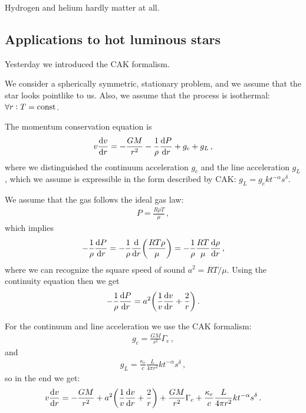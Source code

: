 \documentclass[main.tex]{subfiles}
\begin{document}
Hydrogen and helium hardly matter at all.
 
\subsection{Applications to hot luminous stars}

Yesterday we introduced the CAK formalism. 

We consider a spherically symmetric, stationary problem, and we assume that the star looks pointlike to us. 
Also, we assume that the process is isothermal: \(\forall r: T = \text{const} \). 

The momentum conservation equation is 
%
\begin{align}
v \dv{v}{r} = - \frac{GM}{r^2} - \frac{1}{\rho} \dv{P}{r} 
+ g_{c} + g_{L} 
\,,
\end{align}
%
where we distinguished the continuum acceleration \(g_{c}\) and the line acceleration \(g_{L}\), which we assume is expressible in the form described by CAK: \(g_L = g_e k t^{-\alpha } s^{ \delta } \). 

We assume that the gas follows the ideal gas law: 
%
\begin{align}
  P = \frac{R \rho T}{\mu }
\,,
\end{align}
%
which implies 
%
\begin{align}
  - \frac{1}{\rho } \dv{P}{r} = - \frac{1}{\rho }
  \dv{}{r} \qty(\frac{R T \rho }{\mu })
  = - \frac{1}{\rho } \frac{RT}{\mu } \dv{\rho }{r}
\,,
\end{align}
%
where we can recognize the square speed of sound \(a^2 = RT / \mu \). Using the continuity equation then we get 
%
\begin{align}
  - \frac{1}{\rho } \dv{P}{r} = a^2 \qty(\frac{1}{v} \dv{v}{r} + \frac{2}{r})
\,.
\end{align}

For the continuum and line acceleration we use the CAK formalism: 
%
\begin{align}
  g_{c} = \frac{GM}{r^2} \Gamma_{e}
\,,
\end{align}
%
and 
%
\begin{align}
  g_{L} = \frac{\kappa_{e}}{c} \frac{L}{4 \pi r^2} k t^{-\alpha } s^{ \delta }
\,,
\end{align}
%
so in the end we get: 
%
\begin{align}
    v \dv{v}{r} = - \frac{GM}{r^2} + a^2 \qty(\frac{1}{v} \dv{v}{r} + \frac{2}{r}) 
    + \frac{GM}{r^2} \Gamma_{c} + \frac{\kappa_{e}}{c} \frac{L}{4 \pi r^2} k t^{-\alpha } s^{ \delta }
\,.
\end{align}
\end{document}
